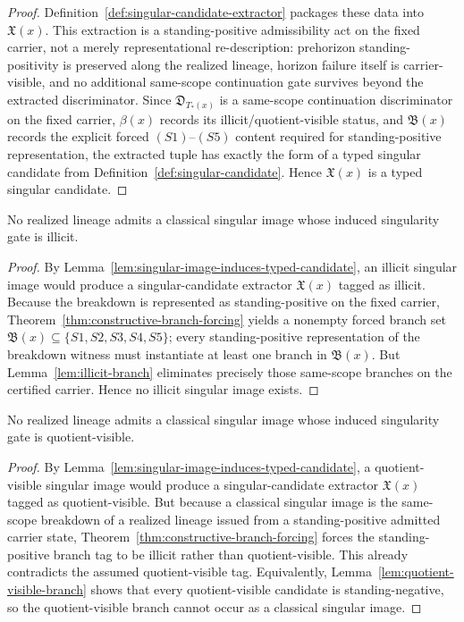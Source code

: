 \begin{proof}
Definition~\ref{def:singular-candidate-extractor} packages these data into $\mathfrak X(x)$. This extraction is a standing-positive admissibility act on the fixed carrier, not a merely representational re-description: prehorizon standing-positivity is preserved along the realized lineage, horizon failure itself is carrier-visible, and no additional same-scope continuation gate survives beyond the extracted discriminator. Since $\mathfrak D_{T_*(x)}$ is a same-scope continuation discriminator on the fixed carrier, $\beta(x)$ records its illicit/quotient-visible status, and $\mathfrak B(x)$ records the explicit forced $(S1)$--$(S5)$ content required for standing-positive representation, the extracted tuple has exactly the form of a typed singular candidate from Definition~\ref{def:singular-candidate}. Hence $\mathfrak X(x)$ is a typed singular candidate.
\end{proof}

\begin{proposition}\label{prop:no-illicit-singular-image}
No realized lineage admits a classical singular image whose induced singularity gate is illicit.
\end{proposition}

\begin{proof}
By Lemma~\ref{lem:singular-image-induces-typed-candidate}, an illicit singular image would produce a
singular-candidate extractor $\mathfrak X(x)$ tagged as illicit. Because the breakdown is represented
as standing-positive on the fixed carrier, Theorem~\ref{thm:constructive-branch-forcing} yields a
nonempty forced branch set $\mathfrak B(x)\subseteq\{S1,S2,S3,S4,S5\}$; every standing-positive
representation of the breakdown witness must instantiate at least one branch in $\mathfrak B(x)$.
But Lemma~\ref{lem:illicit-branch} eliminates precisely those same-scope branches on the certified
carrier. Hence no illicit singular image exists.
\end{proof}

\begin{proposition}\label{prop:no-quotient-visible-singular-image}
No realized lineage admits a classical singular image whose induced singularity gate is
quotient-visible.
\end{proposition}

\begin{proof}
By Lemma~\ref{lem:singular-image-induces-typed-candidate}, a quotient-visible singular image would
produce a singular-candidate extractor $\mathfrak X(x)$ tagged as quotient-visible. But because a
classical singular image is the same-scope breakdown of a realized lineage issued from a
standing-positive admitted carrier state, Theorem~\ref{thm:constructive-branch-forcing} forces the
standing-positive branch tag to be illicit rather than quotient-visible. This already contradicts the
assumed quotient-visible tag. Equivalently, Lemma~\ref{lem:quotient-visible-branch} shows that every
quotient-visible candidate is standing-negative, so the quotient-visible branch cannot occur as a
classical singular image.
\end{proof}

